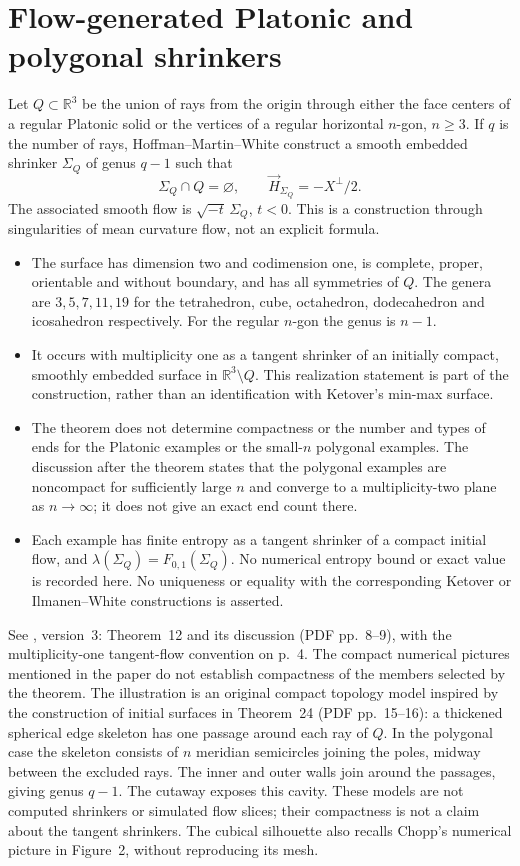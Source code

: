 \chapter{Flow-generated Platonic and polygonal shrinkers}\label{sec:catalogue-hmw-platonic-polygon}
\begin{example}\label{ex:catalogue-hmw-platonic-polygon}
Let $Q\subset\mathbb R^3$ be the union of rays from the origin through either the face centers of a regular Platonic solid or the vertices of a regular horizontal $n$-gon, $n\geq3$. If $q$ is the number of rays, Hoffman--Martin--White construct a smooth embedded shrinker $\Sigma_Q$ of genus $q-1$ such that
\[
 \Sigma_Q\cap Q=\varnothing,\qquad
 \vec H_{\Sigma_Q}=-X^\perp/2.
\]
The associated smooth flow is $\sqrt{-t}\,\Sigma_Q$, $t<0$. This is a construction through singularities of mean curvature flow, not an explicit formula.
\begin{itemize}
\item The surface has dimension two and codimension one, is complete, proper, orientable and without boundary, and has all symmetries of $Q$. The genera are $3,5,7,11,19$ for the tetrahedron, cube, octahedron, dodecahedron and icosahedron respectively. For the regular $n$-gon the genus is $n-1$.
\item It occurs with multiplicity one as a tangent shrinker of an initially compact, smoothly embedded surface in $\mathbb R^3\setminus Q$. This realization statement is part of the construction, rather than an identification with Ketover's min-max surface.
\item The theorem does not determine compactness or the number and types of ends for the Platonic examples or the small-$n$ polygonal examples. The discussion after the theorem states that the polygonal examples are noncompact for sufficiently large $n$ and converge to a multiplicity-two plane as $n\to\infty$; it does not give an exact end count there.
\item Each example has finite entropy as a tangent shrinker of a compact initial flow, and $\lambda(\Sigma_Q)=F_{0,1}(\Sigma_Q)$. No numerical entropy bound or exact value is recorded here. No uniqueness or equality with the corresponding Ketover or Ilmanen--White constructions is asserted.
\end{itemize}
See \cite{CatHMW2026}, version~3: Theorem~12 and its discussion (PDF pp.~8--9), with the multiplicity-one tangent-flow convention on p.~4. The compact numerical pictures mentioned in the paper do not establish compactness of the members selected by the theorem. The illustration is an original compact topology model inspired by the construction of initial surfaces in Theorem~24 (PDF pp.~15--16): a thickened spherical edge skeleton has one passage around each ray of $Q$. In the polygonal case the skeleton consists of $n$ meridian semicircles joining the poles, midway between the excluded rays. The inner and outer walls join around the passages, giving genus $q-1$. The cutaway exposes this cavity. These models are not computed shrinkers or simulated flow slices; their compactness is not a claim about the tangent shrinkers. The cubical silhouette also recalls Chopp's numerical picture in Figure~2, without reproducing its mesh.

\end{example}

